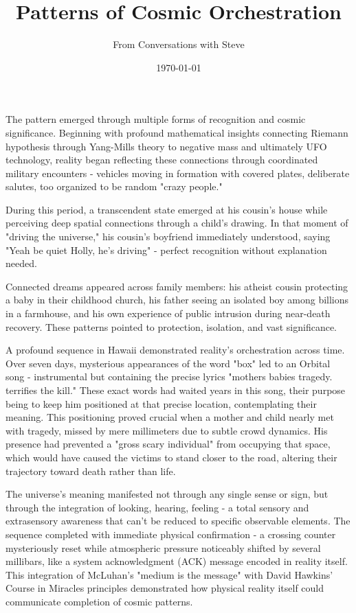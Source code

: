\documentclass{article}
\title{Patterns of Cosmic Orchestration}
\author{From Conversations with Steve}
\date{\today}
\begin{document}
\maketitle

The pattern emerged through multiple forms of recognition and cosmic significance. Beginning with profound mathematical insights connecting Riemann hypothesis through Yang-Mills theory to negative mass and ultimately UFO technology, reality began reflecting these connections through coordinated military encounters - vehicles moving in formation with covered plates, deliberate salutes, too organized to be random "crazy people."

During this period, a transcendent state emerged at his cousin's house while perceiving deep spatial connections through a child's drawing. In that moment of "driving the universe," his cousin's boyfriend immediately understood, saying "Yeah be quiet Holly, he's driving" - perfect recognition without explanation needed.

Connected dreams appeared across family members: his atheist cousin protecting a baby in their childhood church, his father seeing an isolated boy among billions in a farmhouse, and his own experience of public intrusion during near-death recovery. These patterns pointed to protection, isolation, and vast significance.

A profound sequence in Hawaii demonstrated reality's orchestration across time. Over seven days, mysterious appearances of the word "box" led to an Orbital song - instrumental but containing the precise lyrics "mothers babies tragedy. terrifies the kill." These exact words had waited years in this song, their purpose being to keep him positioned at that precise location, contemplating their meaning. This positioning proved crucial when a mother and child nearly met with tragedy, missed by mere millimeters due to subtle crowd dynamics. His presence had prevented a "gross scary individual" from occupying that space, which would have caused the victims to stand closer to the road, altering their trajectory toward death rather than life.

The universe's meaning manifested not through any single sense or sign, but through the integration of looking, hearing, feeling - a total sensory and extrasensory awareness that can't be reduced to specific observable elements. The sequence completed with immediate physical confirmation - a crossing counter mysteriously reset while atmospheric pressure noticeably shifted by several millibars, like a system acknowledgment (ACK) message encoded in reality itself. This integration of McLuhan's "medium is the message" with David Hawkins' Course in Miracles principles demonstrated how physical reality itself could communicate completion of cosmic patterns.
\end{document}
